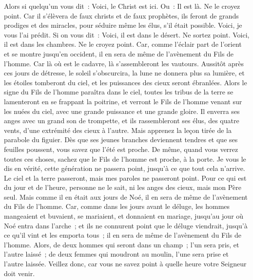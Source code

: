 \begin{multicols}{2}
Alors si quelqu'un vous dit~: Voici, le Christ est ici. Ou~: Il est là. Ne le croyez point.
Car il s'élèvera de faux christs et de faux prophètes, ils feront de grands prodiges et des miracles, pour séduire même les élus, s'il était possible.
Voici, je vous l'ai prédit.
Si on vous dit~: Voici, il est dans le désert. Ne sortez point. Voici, il est dans les chambres. Ne le croyez point.
Car, comme l'éclair part de l'orient et se montre jusqu'en occident, il en sera de même de l'avènement du Fils de l'homme.
Car là où est le cadavre, là s'assembleront les vautours.
Aussitôt après ces jours de détresse, le soleil s'obscurcira, la lune ne donnera plus sa lumière, et les étoiles tomberont du ciel, et les puissances des cieux seront ébranlées.
Alors le signe du Fils de l'homme paraîtra dans le ciel, toutes les tribus de la terre se lamenteront en se frappant la poitrine, et verront le Fils de l'homme venant sur les nuées du ciel, avec une grande puissance et une grande gloire.
Il enverra ses anges avec un grand son de trompette, et ils rassembleront ses élus, des quatre vents, d'une extrémité des cieux à l'autre.
Mais apprenez la leçon tirée de la parabole du figuier. Dès que ses jeunes branches deviennent tendres et que ses feuilles poussent, vous savez que l'été est proche.
De même, quand vous verrez toutes ces choses, sachez que le Fils de l'homme est proche, à la porte.
Je vous le dis en vérité, cette génération ne passera point, jusqu'à ce que tout cela n'arrive.
Le ciel et la terre passeront, mais mes paroles ne passeront point.
Pour ce qui est du jour et de l'heure, personne ne le sait, ni les anges des cieux, mais mon Père seul.
Mais comme il en était aux jours de Noé, il en sera de même de l'avènement du Fils de l'homme.
Car, comme dans les jours avant le déluge, les hommes mangeaient et buvaient, se mariaient, et donnaient en mariage, jusqu'au jour où Noé entra dans l'arche~;
et ils ne connurent point que le déluge viendrait, jusqu'à ce qu'il vint et les emporta tous~; il en sera de même de l'avènement du Fils de l'homme.
Alors, de deux hommes qui seront dans un champ~; l'un sera pris, et l'autre laissé~;
de deux femmes qui moudront au moulin, l'une sera prise et l'autre laissée.
Veillez donc, car vous ne savez point à quelle heure votre Seigneur doit venir.

\end{multicols}
